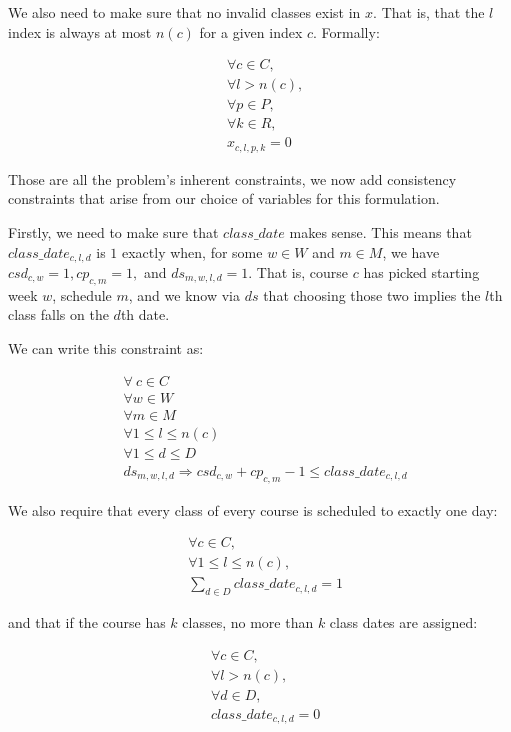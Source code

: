 We also need to make sure that no invalid classes exist in $x$. That is, that the $l$ index is always at most $n(c)$ for a given index $c$. Formally:

\begin{align} \label{eq:noinvalidclasses}
 &\forall c\in C,\\
 &\forall l > n(c),\\
 &\forall p \in P,\\
 &\forall k \in R,\\
 &x_{c, l, p, k} = 0
\end{align}

Those are all the problem's inherent constraints, we now add consistency constraints that arise from our choice of variables for this formulation.

Firstly, we need to make sure that $class\_date$ makes sense. This means that $class\_date_{c, l, d}$ is $1$ exactly when, for some $w \in W$ and $m \in M$, we have $csd_{c, w} = 1, cp_{c, m} = 1,$ and $ds_{m, w, l, d} = 1$. That is, course $c$ has picked starting week $w$, schedule $m$, and we know via $ds$ that choosing those two implies the $l$th class falls on the $d$th date.

We can write this constraint as:

\begin{align}
  &\forall\ c \in C\\
  &\forall w \in W\\
  &\forall m \in M\\
  &\forall 1 \le l \le n(c)\\
  &\forall 1 \le d \le D\\
  &ds_{m, w, l, d} \Rightarrow csd_{c, w} + cp_{c, m} - 1 \le class\_date_{c, l, d}
\end{align}

We also require that every class of every course is scheduled to exactly one day:

\begin{align} \label{eq:oneclassdate}
  &\forall c \in C,\\
  &\forall 1 \le l \le n(c),\\
  &\sum_{d \in D} class\_date_{c, l, d} = 1
\end{align}

and that if the course has $k$ classes, no more than $k$ class dates are assigned:

\begin{align} \label{eq:maxclassdates}
  &\forall c \in C,\\
  &\forall l > n(c),\\
  &\forall d \in D,\\
  &class\_date_{c, l, d} = 0
\end{align}

